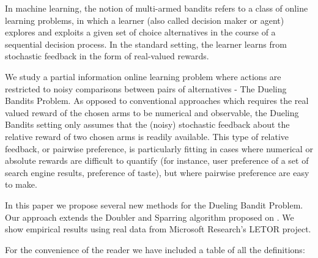 \documentclass[MSc,beforeExam]{iitcsthesis}
\begin{document}







\maketitleEnglish

\abstractEnglish
In machine learning, the notion of multi-armed bandits refers
to a class of online learning problems, in which a learner (also called decision maker or agent) explores and exploits a given set of choice alternatives in the course of a sequential decision process. 
In the standard setting, the learner learns from stochastic feedback in the form of real-valued rewards.

We study a partial information online learning problem
where actions are restricted to noisy comparisons
between pairs of alternatives - The Dueling Bandits Problem. 
As opposed to conventional approaches
which requires the real valued reward of the chosen arms
to be numerical and observable, the Dueling Bandits setting
only assumes that the (noisy) stochastic feedback about
the relative reward of two chosen arms is readily available.
This type of relative feedback, or pairwise preference, is particularly
fitting in cases where numerical or absolute rewards
are difficult to quantify
(for instance, user preference of a set of search engine
results, preference of taste), but
where pairwise preference are easy to make.

In this paper we propose several new methods for the Dueling Bandit Problem. Our approach extends the Doubler and Sparring algorithm proposed on \cite{ailon2014reducing}. We show empirical results using real data from Microsoft Research's LETOR project.

\abbreviationsAndNotationsEnglish
For the convenience of the reader we have included a table of all the definitions: 
\end{document}
